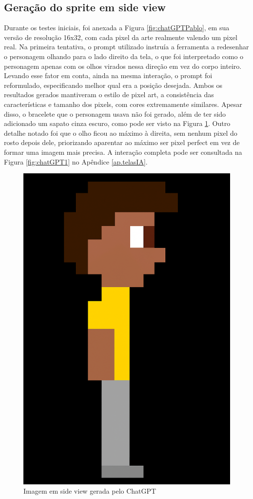 \FloatBarrier
\subsection{Geração do sprite em side view}
\label{s.chatGPT.sideview}

Durante os testes iniciais, foi anexada a Figura \ref{fig:chatGPTPablo}, em sua versão de resolução 16x32, com cada pixel da arte realmente valendo um pixel real. Na primeira tentativa, o prompt utilizado instruía a ferramenta a redesenhar o personagem olhando para o lado direito da tela, o que foi interpretado como o personagem apenas com os olhos virados nessa direção em vez do corpo inteiro. Levando esse fator em conta, ainda na mesma interação, o prompt foi reformulado, especificando melhor qual era a posição desejada. Ambos os resultados gerados mantiveram o estilo de pixel art, a consistência das características e tamanho dos pixels, com cores extremamente similares. Apesar disso, o bracelete que o personagem usava não foi gerado, além de ter sido adicionado um sapato cinza escuro, como pode ser visto na Figura \ref{fig:chatGPTSideViewPixel}. Outro detalhe notado foi que o olho ficou ao máximo à direita, sem nenhum pixel do rosto depois dele, priorizando aparentar ao máximo ser pixel perfect em vez de formar uma imagem mais precisa. A interação completa pode ser consultada na Figura \ref{fig:chatGPT1} no Apêndice \ref{ap.telasIA}.

\begin{figure}[htbp]
    \centering
    \caption{\small Imagem em side view gerada pelo ChatGPT }
    \label{fig:chatGPTSideViewPixel}
    \includegraphics[width=0.3\linewidth]{figs/chatGPT/visao_lateral/res2_pixel.png}
\end{figure}

